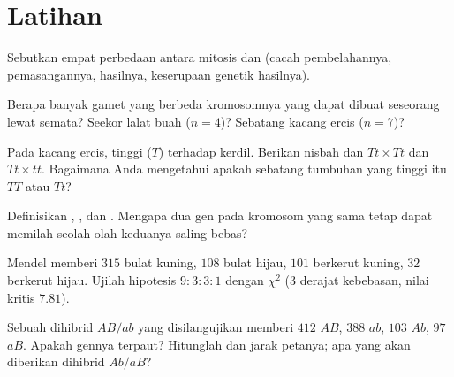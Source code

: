 \section{Latihan}

\begin{exercise}[$\star$]\label{exo:b2:meiosis-heredity:1}
Sebutkan empat perbedaan antara mitosis dan  (cacah
pembelahannya, pemasangannya, hasilnya, keserupaan genetik hasilnya).
\end{exercise}

\begin{exercise}[$\star$]\label{exo:b2:meiosis-heredity:2}
Berapa banyak gamet yang berbeda kromosomnya yang dapat dibuat
seseorang lewat  semata? Seekor lalat buah ($n = 4$)? Sebatang kacang ercis ($n =
7$)?
\end{exercise}

\begin{exercise}[$\star$]\label{exo:b2:meiosis-heredity:3}
Pada kacang ercis, tinggi ($T$)  terhadap kerdil. Berikan nisbah
 dan  $Tt \times Tt$ dan $Tt \times tt$. Bagaimana Anda
mengetahui apakah sebatang tumbuhan yang tinggi itu $TT$ atau $Tt$?
\end{exercise}

\begin{exercise}[$\star$]\label{exo:b2:meiosis-heredity:4}
Definisikan , , dan . Mengapa dua
gen pada kromosom yang sama tetap dapat memilah seolah-olah keduanya
saling bebas?
\end{exercise}

\begin{exercise}[$\star\star$]\label{exo:b2:meiosis-heredity:5}
 Mendel memberi $315$ bulat kuning, $108$ bulat
hijau, $101$ berkerut kuning, $32$ berkerut hijau. Ujilah hipotesis $9 : 3 : 3 :
1$ dengan $\chi^2$ (3 derajat kebebasan, nilai kritis $7.81$).
\end{exercise}

\begin{exercise}[$\star\star$]\label{exo:b2:meiosis-heredity:6}
Sebuah dihibrid $AB/ab$ yang disilangujikan memberi $412$ $AB$, $388$
$ab$, $103$ $Ab$, $97$ $aB$. Apakah gennya terpaut? Hitunglah  dan jarak petanya; apa yang akan diberikan dihibrid $Ab/aB$?
\end{exercise}

